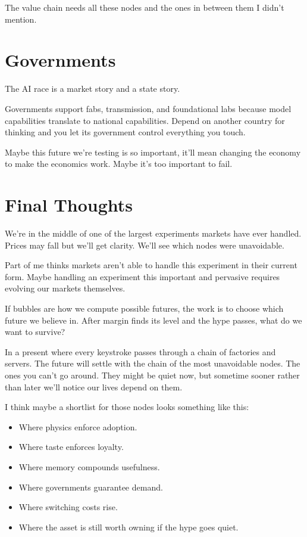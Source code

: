 \documentclass[12pt,letterpaper]{article}
\begin{document}
The value chain needs all these nodes and the ones in between them I didn't mention.

\section{Governments}

The AI race is a market story and a state story.

Governments support fabs, transmission, and foundational labs because model capabilities translate to national capabilities. Depend on another country for thinking and you let its government control everything you touch.

Maybe this future we're testing is so important, it'll mean changing the economy to make the economics work. Maybe it's too important to fail.

\section{Final Thoughts}

We're in the middle of one of the largest experiments markets have ever handled. Prices may fall but we'll get clarity. We'll see which nodes were unavoidable.

Part of me thinks markets aren't able to handle this experiment in their current form. Maybe handling an experiment this important and pervasive requires evolving our markets themselves.

If bubbles are how we compute possible futures, the work is to choose which future we believe in. After margin finds its level and the hype passes, what do we want to survive?

In a present where every keystroke passes through a chain of factories and servers. The future will settle with the chain of the most unavoidable nodes. The ones you can't go around. They might be quiet now, but sometime sooner rather than later we'll notice our lives depend on them.

I think maybe a shortlist for those nodes looks something like this:

\begin{itemize}
    \item Where physics enforce adoption.
    \item Where taste enforces loyalty.
    \item Where memory compounds usefulness.
    \item Where governments guarantee demand.
    \item Where switching costs rise.
    \item Where the asset is still worth owning if the hype goes quiet.
\end{itemize}
\end{document}
